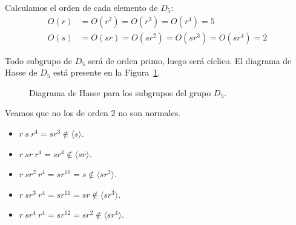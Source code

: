 \begin{ejercicio}
\begin{enumerate}
        Calculamos el orden de cada elemento de $D_5$:
        \begin{align*}
            O(r) &= O(r^2) = O(r^3) = O(r^4) = 5 \\
            O(s) &= O(sr) = O(sr^2) = O(sr^3) = O(sr^4) = 2
        \end{align*}

        Todo subgrupo de $D_5$ será de orden primo, luego será cíclico. El diagrama de Hasse de $D_5$ está presente en la Figura~\ref{fig:Hasse_D5}.
        \begin{figure}
            \centering
            \caption{Diagrama de Hasse para los subgrupos del grupo $D_5$.}
            \label{fig:Hasse_D5}
        \end{figure}     
        
        Veamos que no los de orden $2$ no son normales.
        \begin{itemize}
            \item $r\ s\ r^4 = sr^3 \notin \langle s \rangle$.
            \item $r\ sr \ r^4 = sr^4 \notin \langle sr \rangle$.
            \item $r\ sr^2 \ r^4 = sr^{10} = s \notin \langle sr^2 \rangle$.
            \item $r\ sr^3 \ r^4 = sr^{11} = sr \notin \langle sr^3 \rangle$.
            \item $r\ sr^4 \ r^4 = sr^{12} = sr^2 \notin \langle sr^4 \rangle$.
        \end{itemize}


\end{enumerate}
\end{ejercicio}
